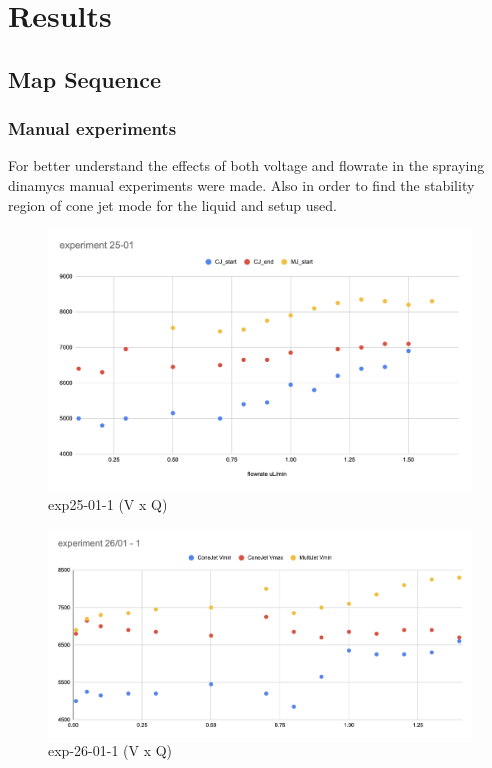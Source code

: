 \chapter{Results}
\label{chap:Results}

\section{Map Sequence}
\label{sec:map_results}

\subsection{Manual experiments}


For better understand the effects of both voltage and flowrate in the spraying dinamycs manual experiments were made.
Also in order to find the stability region of cone jet mode for the liquid and setup used.


    \begin{figure}[H]
        \center
        \includegraphics[width=12cm]{Figuras/report3/exp25-01-1.png}
        \caption{ exp25-01-1 (V x Q)}
    \end{figure}

    \begin{figure}[H]
        \center
        \includegraphics[width=12cm]{Figuras/report3/exp-26-01-1.png}
        \caption{ exp-26-01-1 (V x Q)}
    \end{figure}

